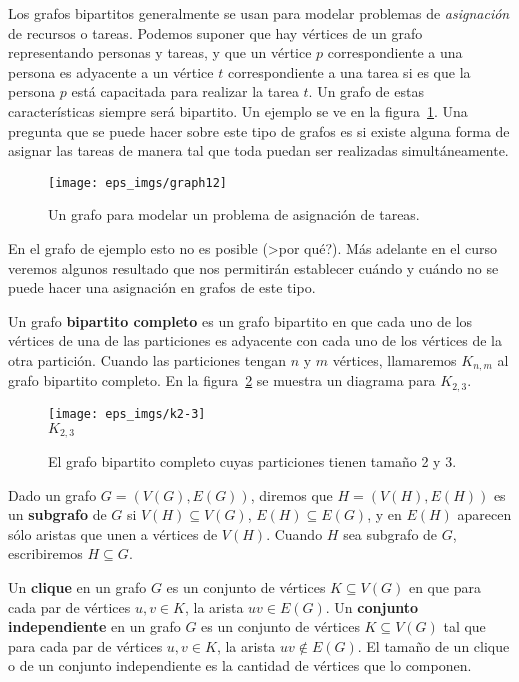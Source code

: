 \begin{ejemplo}
Los grafos bipartitos generalmente se usan para modelar problemas de \emph{asignación} de recursos o tareas.
Podemos suponer que hay vértices de un grafo representando personas y tareas, y que un vértice $p$ correspondiente a una persona es adyacente a un vértice $t$ correspondiente a una tarea si es que la persona $p$ está capacitada para realizar la tarea $t$.
Un grafo de estas características siempre será bipartito.
Un ejemplo se ve en la figura~\ref{fig:job-ass}.
Una pregunta que se puede hacer sobre este tipo de grafos es si existe alguna forma de asignar las tareas de manera tal que toda puedan ser realizadas simultáneamente.
\begin{figure}[h!]
\centering
\texttt{[image: eps\_imgs/graph12]}
\caption{Un grafo para modelar un problema de asignación de tareas.}
\label{fig:job-ass}
\end{figure} 
En el grafo de ejemplo esto no es posible (>por qué?).
Más adelante en el curso veremos algunos resultado que nos permitirán establecer cuándo y cuándo no se puede hacer una asignación en grafos de este tipo.
\end{ejemplo}

\begin{definicion}
Un grafo {\bf bipartito completo} es un grafo bipartito en que cada uno de los vértices de una de las particiones es adyacente con cada uno de los vértices de la otra partición.
Cuando las particiones tengan $n$ y $m$ vértices, llamaremos $K_{n,m}$ al grafo bipartito completo.
En la figura~\ref{fig:k2-3} se muestra un diagrama para $K_{2,3}$.
\begin{figure}[h!]
\centering
\texttt{[image: eps\_imgs/k2-3]}\\
$K_{2,3}$
\caption{El grafo bipartito completo cuyas particiones tienen tamaño 2 y 3.}
\label{fig:k2-3}
\end{figure}
\end{definicion}

\begin{definicion}
Dado un grafo $G=(V(G),E(G))$, diremos que $H=(V(H),E(H))$ es un {\bf subgrafo} de $G$ si $V(H)\subseteq V(G)$, $E(H)\subseteq E(G)$, y en $E(H)$ aparecen sólo aristas que unen a vértices de $V(H)$.
Cuando $H$ sea subgrafo de $G$, escribiremos $H\subseteq G$.

Un {\bf clique} en un grafo $G$ es un conjunto de vértices $K\subseteq V(G)$ en que para cada par de vértices $u,v\in K$, la arista $uv\in E(G)$.
Un {\bf conjunto independiente} en un grafo $G$ es un conjunto de vértices $K\subseteq V(G)$ tal que para cada par de vértices $u,v\in K$, la arista $uv\notin E(G)$.
El tamaño de un clique o de un conjunto independiente es la cantidad de vértices que lo componen.
\end{definicion}

